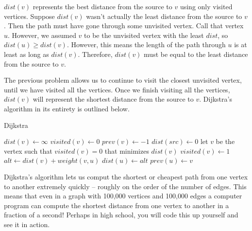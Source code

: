 \documentclass[11pt]{article}
\begin{document}
\begin{solution}
$dist(v)$ represents the best distance from the source to $v$ using only visited vertices. Suppose $dist(v)$ wasn't actually the least
distance from the source to $v$. Then the path must have gone through some unvisited vertex. Call that vertex $u$. However, we assumed $v$ to be the unvisited vertex
with the least $dist$, so $dist(u) \ge dist(v)$. However, this means the length of the path through $u$ is at least as long as $dist(v)$.
Therefore, $dist(v)$ must be equal to the least distance from the source to $v$.
\end{solution}

The previous problem allows us to continue to visit the closest unvisited vertex, until we have visited all the vertices. Once we finish visiting all the vertices,
$dist(v)$ will represent the shortest distance from the source to $v$. Dijkstra's algorithm in its entirety is outlined below.

\begin{algorithm}[H]
\caption{Dijkstra}
\begin{algorithmic}
	\State $dist(v) \gets \infty$ 
	\State $visited(v) \gets 0$ 
    \State $prev(v) \gets -1$ 
\EndFor
\State $dist(src) \gets 0$ 
	\State let $v$ be the vertex such that $visited(v)=0$ that minimizes $dist(v)$
    \State $visited(v) \gets 1$ 
    		\State $alt \gets dist(v) + weight(v, u)$
				\State $dist(u) \gets alt$ 
   	        	\State $prev(u) \gets v$
			\EndIf
        \EndIf
    \EndFor
\EndWhile
\end{algorithmic}
\end{algorithm}

Dijkstra's algorithm lets us comput the shortest or cheapest path from one vertex to another extremely quickly -- roughly on the order of the number of edges.
This means that even in a graph with 100,000 vertices and 100,000 edges a computer program can compute the shortest distance from one vertex to another in a fraction of 
a second! Perhaps in high school, you will code this up yourself and see it in action.
\end{document}
